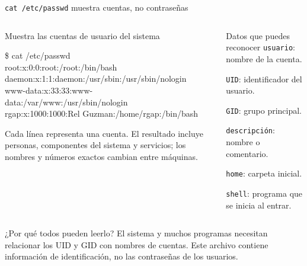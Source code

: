\documentclass[aspectratio=169,10pt,c]{beamer}
\begin{document}
\begin{frame}{\texttt{cat /etc/passwd} muestra cuentas, no contraseñas}
\begin{columns}[T,onlytextwidth]
\begin{exampleblock}{Muestra las cuentas de usuario del sistema}
\begin{terminal}\scriptsize
\$ cat /etc/passwd\\
root:x:0:0:root:/root:/bin/bash\\
daemon:x:1:1:daemon:/usr/sbin:/usr/sbin/nologin\\
www-data:x:33:33:www-data:/var/www:/usr/sbin/nologin\\
rgap:x:1000:1000:Rel Guzman:/home/rgap:/bin/bash
\end{terminal}
\small Cada línea representa una cuenta. El resultado incluye personas, componentes del sistema y servicios; los nombres y números exactos cambian entre máquinas.
\end{exampleblock}
\begin{block}{Datos que puedes reconocer}
\footnotesize
\texttt{usuario}: nombre de la cuenta.\par\smallskip
\texttt{UID}: identificador del usuario.\par\smallskip
\texttt{GID}: grupo principal.\par\smallskip
\texttt{descripción}: nombre o comentario.\par\smallskip
\texttt{home}: carpeta inicial.\par\smallskip
\texttt{shell}: programa que se inicia al entrar.
\end{block}
\end{columns}
\begin{alertblock}{¿Por qué todos pueden leerlo?}
\small El sistema y muchos programas necesitan relacionar los UID y GID con nombres de cuentas. Este archivo contiene información de identificación, no las contraseñas de los usuarios.
\end{alertblock}
\end{frame}
\end{document}
